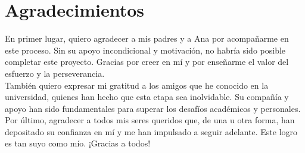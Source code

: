 



\chapter*{Agradecimientos}
\thispagestyle{empty}

       \vspace{1cm}


En primer lugar, quiero agradecer a mis padres y a Ana por acompañarme en este proceso. Sin su apoyo incondicional y motivación, no habría sido posible completar este proyecto. 
Gracias por creer en mí y por enseñarme el valor del esfuerzo y la perseverancia.\\

También quiero expresar mi gratitud a los amigos que he conocido en la universidad, quienes han hecho que esta etapa sea inolvidable. Su compañía y apoyo han sido fundamentales para superar los desafíos académicos y personales.\\

Por último, agradecer a todos mis seres queridos que, de una u otra forma, han depositado su confianza en mí y
me han impulsado a seguir adelante. Este logro es tan suyo como mío. ¡Gracias a todos!
